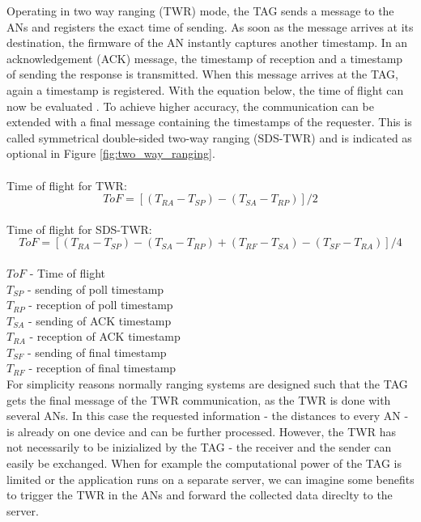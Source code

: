 Operating in two way ranging (TWR) mode, the TAG sends a message to the ANs and registers the exact time of sending. As soon as the message arrives at its destination, the firmware of the AN instantly captures another timestamp. In an acknowledgement (ACK) message, the timestamp of reception and a timestamp of sending the response is transmitted. When this message arrives at the TAG, again a timestamp is registered. With the equation below, the time of flight can now be evaluated \cite{SewioTWR}.
To achieve higher accuracy, the communication can be extended with a final message containing the timestamps of the requester. This is called symmetrical double-sided two-way ranging (SDS-TWR) \cite{Wikipedia} and is indicated as optional in Figure \ref{fig:two_way_ranging}.\\
\\
Time of flight for TWR:\\
$$ ToF = [(T_{RA}-T_{SP})-(T_{SA}-T_{RP})] / 2$$\\
Time of flight for SDS-TWR:\\
$$ ToF = [(T_{RA}-T_{SP})-(T_{SA}-T_{RP}) + (T_{RF}-T_{SA})-(T_{SF}-T_{RA}) ]/ 4$$\\
$ToF$ - Time of flight\\
$T_{SP}$ - sending of poll timestamp \\
$T_{RP}$ - reception of poll timestamp\\
$T_{SA}$ - sending of ACK timestamp \\
$T_{RA}$ - reception of ACK timestamp\\
$T_{SF}$ - sending of final timestamp \\
$T_{RF}$ - reception of final timestamp\\

For simplicity reasons normally ranging systems are designed such that the TAG gets the final message of the TWR communication, as the TWR is done with several ANs. In this case the requested information - the distances to every AN - is already on one device and can be further processed. However, the TWR has not necessarily to be inizialized by the TAG - the receiver and the sender can easily be exchanged. When for example the computational power of the TAG is limited or the application runs on a separate server, we can imagine some benefits to trigger the TWR in the ANs and forward the collected data direclty to the server.

